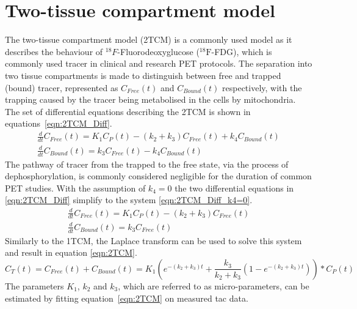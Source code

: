 \section{Two-tissue compartment model}
The two-tissue compartment model (2TCM) is a commonly used model as it describes the behaviour of ${}^{18}F$-Fluorodeoxyglucose (${}^{18}\mathrm{F}$-FDG), which is commonly used tracer in clinical and research PET protocols. The separation into two tissue compartments is made to distinguish between free and trapped (bound) tracer, represented as $C_{Free}(t)$ and $C_{Bound}(t)$ respectively, with the trapping caused by the tracer being metabolised in the cells by mitochondria. The set of differential equations describing the 2TCM is shown in equations~\ref{eqn:2TCM_Diff}.
%
\begin{subequations}
\begin{align}
\frac{d}{dt}C_{Free}(t) = K_1 C_P(t) - (k_2 + k_3)C_{Free}(t) + k_4 C_{Bound}(t) \\ 
\frac{d}{dt}C_{Bound}(t) = k_3 C_{Free}(t) - k_4 C_{Bound}(t)  
\end{align}
\label{eqn:2TCM_Diff}
\end{subequations}
%
The pathway of tracer from the trapped to the free state, via the process of dephosphorylation, is commonly considered negligible for the duration of common PET studies. With the assumption of $k_4=0$ the two differential equations in \ref{eqn:2TCM_Diff} simplify to the system \ref{eqn:2TCM_Diff_k4=0}. 
\begin{subequations}
\begin{align}
\frac{d}{dt}C_{Free}(t) = K_1 C_P(t) - (k_2 + k_3)C_{Free}(t) \\ 
\frac{d}{dt}C_{Bound}(t) = k_3 C_{Free}(t)  
\end{align}
\label{eqn:2TCM_Diff_k4=0}
\end{subequations}
Similarly to the 1TCM, the Laplace transform can be used to solve this system and result in equation \ref{eqn:2TCM}.
\begin{equation}
C_T(t) =  C_{Free}(t) + C_{Bound}(t) = K_1 ( e^{-(k_2+k_3)t} + \frac{k_3}{k_2+k_3}(1-e^{-(k_2+k_3)t})) \ast C_P(t)   
\label{eqn:2TCM}
\end{equation}
%
The parameters $K_1$, $k_2$ and $k_3$, which are referred to as micro-parameters, can be estimated by fitting equation~\ref{eqn:2TCM} on measured \gls{tac} data. 


